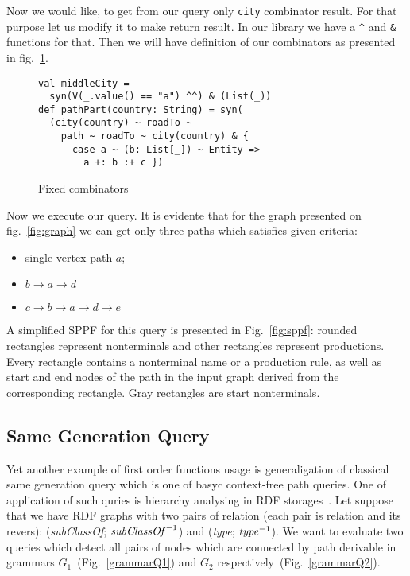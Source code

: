 Now we would like, to get from our query only \lstinline{city} combinator result. 
For that purpose let us modify it to make return result. 
In our library we have a \lstinline{^} and \lstinline{&} functions for that. 
Then we will have definition of our combinators as presented in fig.~\ref{fig:fixedAtor}.

\begin{figure}[h]
\begin{lstlisting}
val middleCity = 
  syn(V(_.value() == "a") ^^) & (List(_))
def pathPart(country: String) = syn(
  (city(country) ~ roadTo ~ 
    path ~ roadTo ~ city(country) & {
      case a ~ (b: List[_]) ~ Entity => 
        a +: b :+ c })
\end{lstlisting}
\caption{Fixed combinators}
\label{fig:fixedAtor}
\end{figure}

Now we execute our query. It is evidente that for the graph presented on fig.~\ref{fig:graph} we can get only three paths which satisfies given criteria:
\begin{itemize}
\item single-vertex path $a$;
\item $b \rightarrow a \rightarrow d$
\item $c \rightarrow b \rightarrow a \rightarrow d \rightarrow e$
\end{itemize}

A simplified SPPF for this query is presented in Fig.~\ref{fig:sppf}: rounded rectangles represent nonterminals and other rectangles represent productions. 
Every rectangle contains a nonterminal name or a production rule, as well as start and end nodes of the path in the input graph derived from the corresponding rectangle. 
Gray rectangles are start nonterminals.

\subsection{Same Generation Query}

Yet another example of first order functions usage is generaligation of classical same generation query which is one of basyc context-free path queries.
One of application of such quries is hierarchy analysing in RDF storages~\cite{RDF}.
Let suppose that we have RDF graphs with two pairs of relation (each pair is relation and its revers): (\emph{subClassOf}; $\text{\emph{subClassOf}}^{-1}$) and (\emph{type}; $\text{\emph{type}}^{-1}$).
We want to evaluate two queries which detect all pairs of nodes which are connected by path derivable in grammars $G_1$~(Fig.~\ref{grammarQ1}) and $G_2$ respectively~(Fig.~\ref{grammarQ2}). 


